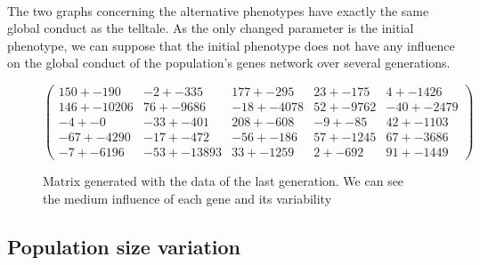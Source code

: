 \documentclass[]{report} %
\begin{document}
    \paragraph*{}
    The two graphs concerning the alternative phenotypes have exactly the same global conduct as the telltale. As the only changed parameter is the initial phenotype, we can suppose that the initial phenotype does not have any influence on the global conduct of the population's genes network over several generations.
   

    \begin{figure}[H] 
            \centering
            \small
    $
          \begin{pmatrix}
                150 +- 190 & -2 +- 335 & 177 +- 295 & 23 +- 175 & 4 +- 1426 \\
                146 +- 10206 & 76 +- 9686 & -18 +- 4078 & 52 +- 9762 & -40 +- 2479 \\
                -4 +- 0 & -33 +- 401 & 208 +- 608 & -9 +- 85 & 42 +- 1103 \\
                -67 +- 4290 & -17 +- 472 & -56 +- 186 & 57 +- 1245 & 67 +- 3686 \\
                -7 +- 6196 & -53 +- 13893 & 33 +- 1259 & 2 +- 692 & 91 +- 1449 
           \end{pmatrix}
    $
            \caption{\footnotesize Matrix generated with the data of the last generation. We can see the medium influence of each gene and its variability}
            \label{mat:ps300xg200xmr1-10-4xalt2}
    \end{figure}
    
    
\subsection{Population size variation}
\end{document}
